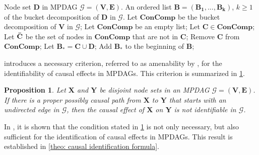 \documentclass{article} %
\newtheorem{proposition}{Proposition}[section]
\begin{document}
\begin{algorithm}
\caption{Partial causal ordering (PCO) \citep[Algorithm 1]{perkovic2020identifying}}
\label{alg: Partial causal ordering (PCO)}
\begin{algorithmic}[1]
 Node set $\mathbf{D}$ in MPDAG $\mathcal{G}=(\mathbf{V}, \mathbf{E})$. 
 An ordered list $\mathbf{B}=(\mathbf{B_1},..., \mathbf{B_k})$, $k \ge 1$ of the bucket decomposition of $\mathbf{D}$ in $\mathcal{G}$.
\State Let $\mathbf{ConComp}$ be the bucket decomposition of $\mathbf{V}$ in $\mathcal{G}$;
\State Let $\mathbf{ConComp}$ be an empty list;
    \State Let $\mathbf{C} \in \mathbf{ConComp}$;
    \State Let $\mathbf{\Bar{C}}$ be the set of nodes in $\mathbf{ConComp}$ that are not in $\mathbf{C}$;
        \State Remove $\mathbf{C}$ from $\mathbf{ConComp}$;
        \State Let $\mathbf{B_{*}} = \mathbf{C} \cup \mathbf{D}$;
            \State Add $\mathbf{B_{*}}$ to the beginning of $\mathbf{B}$;
        \EndIf
    \EndIf
\EndWhile
\end{algorithmic}
\end{algorithm}


\citet{perkovic2020identifying} introduces a necessary criterion, referred to as amenability by \citep{perkovic2015complete, perkovic2017interpreting}, for the identifiability of causal effects in MPDAGs. This criterion is summarized in \cref{prop: necessary condition}.

\begin{proposition}\citep[Proposition 3.2]{perkovic2020identifying} \label{prop: necessary condition}
    Let $\mathbf{X}$ and $\mathbf{Y}$ be disjoint node sets in an MPDAG $\mathcal{G}=(\mathbf{V}, \mathbf{E})$. If there is a proper possibly causal path from $\mathbf{X}$ to $\mathbf{Y}$ that starts with an undirected edge in $\mathcal{G}$, then the causal effect of $\mathbf{X}$ on $\mathbf{Y}$ is not identifiable in $\mathcal{G}$.
\end{proposition}   

In \citet{perkovic2020identifying}, it is shown that the condition stated in \cref{prop: necessary condition} is not only necessary, but also sufficient for the identification of causal effects in MPDAGs. This result is established in \cref{theo: causal identification formula}. 
\end{document}
